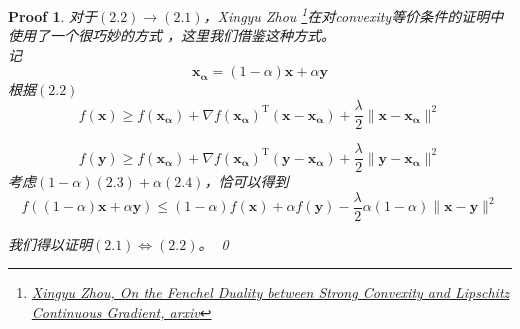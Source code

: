 \documentclass[a4paper,UTF8]{article}
\numberwithin{equation}{section}
\newtheorem*{myProof}{Proof}
\begin{document}
\begin{myProof}
对于$(2.2) \to (2.1)$，Xingyu Zhou \footnote{\href{https://arxiv.org/pdf/1803.06573.pdf}{Xingyu Zhou, On the Fenchel Duality between Strong Convexity and Lipschitz Continuous Gradient, arxiv}}在对convexity等价条件的证明中使用了一个很巧妙的方式 ，这里我们借鉴这种方式。\\
记
\[ \mathbf{x_\alpha} = (1-\alpha) \mathbf{x} + \alpha \mathbf{y} \]
根据$(2.2)$
\begin{equation}
f(\mathbf{x}) \geq f(\mathbf{x_\alpha}) + \nabla f(\mathbf{x_\alpha})^\mathrm{T}(\mathbf{x}-\mathbf{x_\alpha}) + \frac{\lambda}{2}\lVert \mathbf{x} - \mathbf{x_\alpha}\rVert^2 
\end{equation}

\begin{equation} 
f(\mathbf{y}) \geq f(\mathbf{x_\alpha}) + \nabla f(\mathbf{x_\alpha})^\mathrm{T}(\mathbf{y}-\mathbf{x_\alpha}) + \frac{\lambda}{2}\lVert \mathbf{y} - \mathbf{x_\alpha}\rVert^2 
\end{equation}
考虑$(1-\alpha) (2.3) + \alpha (2.4) $，恰可以得到
\[ f((1-\alpha)\mathbf{x} + \alpha\mathbf{y})\leq (1-\alpha)f(\mathbf{x}) + \alpha f(\mathbf{y}) - \frac{\lambda}{2}\alpha(1-\alpha)\lVert \mathbf{x} - \mathbf{y}\rVert^2 \] 

我们得以证明$(2.1) \Leftrightarrow (2.2)$。
\qed
\end{myProof}


\newpage
\end{document}
